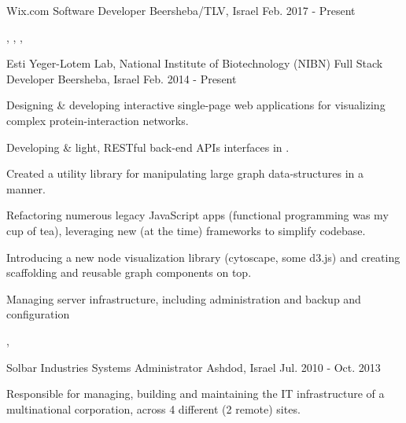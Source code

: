 
\begin{cventries}
      \cventry
    {Wix.com}
    {Software Developer}
    {Beersheba/TLV, Israel}
    {Feb. 2017 - Present}
    {
    }
    \begin{cvskills}
       {}
       {, , , }
    \end{cvskills}
  \cventry
    {Esti Yeger-Lotem Lab, National Institute of Biotechnology (NIBN)}
    {Full Stack Developer}
    {Beersheba, Israel}
    {Feb. 2014 - Present}
    {
      \begin{cvitems}
        \item {Designing \& developing interactive single-page web applications for visualizing complex protein-interaction networks.}
        \item {Developing \& light, RESTful back-end APIs interfaces in .}
        \item {Created a utility library for manipulating large graph data-structures in a  manner.}
        \item {Refactoring numerous legacy JavaScript apps (functional programming was my cup of tea), leveraging new (at the time) frameworks to simplify codebase.}
        \item {Introducing a new node visualization library (cytoscape, some d3.js) and creating scaffolding and reusable graph components on top.}
        \item {Managing server infrastructure, including  administration and backup and  configuration}
      \end{cvitems}

    }
          \begin{cvskills}
       {, }
       {}
    \end{cvskills}
  \cventry
    {Solbar Industries}
    {Systems Administrator}
    {Ashdod, Israel}
    {Jul. 2010 - Oct. 2013}
    {
      \begin{cvitems}
        \item {Responsible for managing, building and maintaining the IT infrastructure of a multinational corporation, across 4 different (2 remote) sites.}
      \end{cvitems}
    }


\end{cventries}
